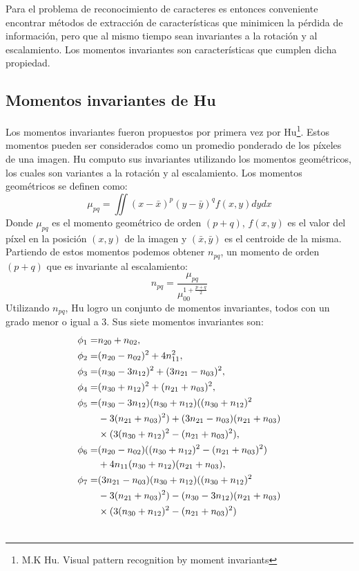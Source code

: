 \documentclass[a4paper, 11pt, oneside]{report}
\begin{document}
Para el problema de reconocimiento de caracteres es entonces conveniente encontrar métodos de extracción de características que minimicen la pérdida de información, pero que al mismo tiempo sean invariantes a la rotación y al escalamiento. Los momentos invariantes son características que cumplen dicha propiedad.
\subsection{Momentos invariantes de Hu} 
\label{sect:invariants}
Los momentos invariantes fueron propuestos por primera vez por Hu\footnote{M.K Hu. Visual pattern recognition by moment invariants}. Estos momentos pueden ser considerados como un promedio ponderado de los píxeles de una imagen. Hu computo sus invariantes utilizando los momentos geométricos, los cuales son variantes a la rotación y al escalamiento. Los momentos geométricos se definen como:
\begin{equation}\label{eq1}
\mu_{pq} = \iint{ {(x-\bar{x})^p} {(y-\bar{y})^q} f(x,y) dy dx }
\end{equation}
Donde $\mu_{pq}$ es el momento geométrico de orden $(p+q)$, $f(x,y)$ es el valor del píxel en la posición $(x,y)$ de la imagen y $(\bar{x},\bar{y})$ es el centroide de la misma. Partiendo de estos momentos podemos obtener $n_{pq}$, un momento de orden $(p+q)$ que es invariante al escalamiento:
\begin{equation}\label{eq2}
n_{pq} = \frac{\mu_{pq}}{ \mu_{00}^{1+\frac{p+q}{2}} }
\end{equation}
Utilizando $n_{pq}$, Hu logro un conjunto de momentos invariantes, todos con un grado menor o igual a 3. Sus siete momentos invariantes son:
\begin{align}
\phi_1 =& n_{20} + n_{02}, \notag\\ 
\phi_2 =& (n_{20} - n_{02})^{2} + 4n_{11}^{2}, \notag \\ 
\phi_3 =& (n_{30} - 3n_{12})^{2} + (3n_{21} - n_{03})^{2}, \notag \\ 
\phi_4 =& (n_{30} + n_{12})^{2} + (n_{21} + n_{03})^{2},\notag \\ 
\phi_5 =& (n_{30} - 3n_{12})(n_{30} + n_{12})((n_{30} + n_{12})^{2} \notag \\
& - 3(n_{21} + n_{03})^{2}) + (3n_{21} - n_{03})(n_{21} + n_{03})\notag\\ 
& \times (3(n_{30} + n_{12})^{2} - (n_{21} + n_{03})^{2}),\notag\\ 
\phi_6 =& (n_{20} - n_{02})((n_{30} + n_{12})^{2} - (n_{21} + n_{03})^{2})\notag\\
& + 4n_{11}(n_{30} + n_{12})(n_{21} + n_{03}),\notag\\
\phi_7 =& (3n_{21} - n_{03})(n_{30} + n_{12})((n_{30} + n_{12})^{2}\notag\\
& - 3(n_{21} + n_{03})^{2}) - (n_{30} - 3n_{12})(n_{21} + n_{03}) \notag\\
& \times (3(n_{30} + n_{12})^{2} - (n_{21} + n_{03})^{2}) \label{eq:huMom} \\ \notag
\end{align}
\end{document}

